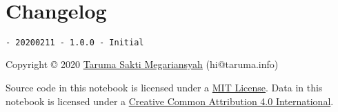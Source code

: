 \documentclass[11pt]{article}
\begin{document}
    \begin{center}
    \end{center}
    { \hspace*{\fill} \\}
    
    \hypertarget{changelog}{%
\section{Changelog}\label{changelog}}

\begin{verbatim}
- 20200211 - 1.0.0 - Initial
\end{verbatim}

Copyright © 2020 \href{https://taruma.github.io}{Taruma Sakti
Megariansyah} (hi@taruma.info)

Source code in this notebook is licensed under a
\href{https://choosealicense.com/licenses/mit/}{MIT License}. Data in
this notebook is licensed under a
\href{https://creativecommons.org/licenses/by/4.0/}{Creative Common
Attribution 4.0 International}.


    
    
    
\end{document}
